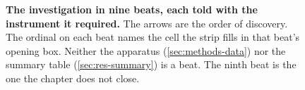\begin{figure}[htbp]
\centering

\caption[The investigation in nine beats]{\textbf{The investigation in nine
beats, each told with the instrument it required.} The arrows are the order of
discovery. The ordinal on each beat names the cell the strip fills in that
beat's opening box. Neither the apparatus (\cref{sec:methods-data}) nor the
summary table (\cref{sec:res-summary}) is a beat. The ninth beat is the one the
chapter does not close.}
\label{fig:timeline}
\end{figure}





